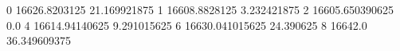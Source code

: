 0 16626.8203125 21.169921875
1 16608.8828125 3.232421875
2 16605.650390625 0.0
4 16614.94140625 9.291015625
6 16630.041015625 24.390625
8 16642.0 36.349609375
